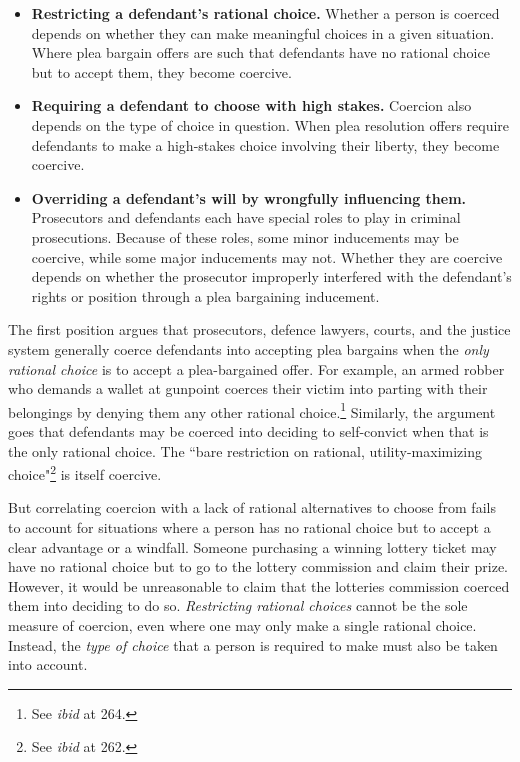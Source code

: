 \begin{itemize}
    \item \textbf{Restricting a defendant's rational choice.} Whether a person is coerced depends on whether they can make meaningful choices in a given situation. Where plea bargain offers are such that defendants have no rational choice but to accept them, they become coercive.
    \item \textbf{Requiring a defendant to choose with high stakes.} Coercion also depends on the type of choice in question. When plea resolution offers require defendants to make a high-stakes choice involving their liberty, they become coercive.
    \item \textbf{Overriding a defendant's will by wrongfully influencing them.} Prosecutors and defendants each have special roles to play in criminal prosecutions. Because of these roles, some minor inducements may be coercive, while some major inducements may not. Whether they are coercive depends on whether the prosecutor improperly interfered with the defendant's rights or position through a plea bargaining inducement.
\end{itemize}
The first position argues that prosecutors, defence lawyers, courts, and the justice system generally coerce defendants into accepting plea bargains when the \textit{only rational choice} is to accept a plea-bargained offer. For example, an armed robber who demands a wallet at gunpoint coerces their victim into parting with their belongings by denying them any other rational choice.\footnote{See \textit{ibid} at 264.} Similarly, the argument goes that defendants may be coerced into deciding to self-convict when that is the only rational choice. The ``bare restriction on rational, utility-maximizing choice"\footnote{See \textit{ibid} at 262.} is itself coercive. 

But correlating coercion with a lack of rational alternatives to choose from fails to account for situations where a person has no rational choice but to accept a clear advantage or a windfall. Someone purchasing a winning lottery ticket may have no rational choice but to go to the lottery commission and claim their prize. However, it would be unreasonable to claim that the lotteries commission coerced them into deciding to do so. \textit{Restricting rational choices} cannot be the sole measure of coercion, even where one may only make a single rational choice. Instead, the \textit{type of choice} that a person is required to make must also be taken into account.

